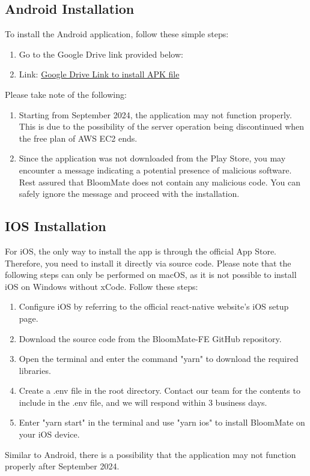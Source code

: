 \documentclass[conference, a4paper]{IEEEtran}
\begin{document}
\subsection{Android Installation}
To install the Android application, follow these simple steps:
\begin{enumerate}
    \item Go to the Google Drive link provided below:
    \item[]Link: \href{https://drive.google.com/drive/folders/1misbKdk9KiIgrsmARhBsaBBLhtyIzM-k?usp=drive_link}{Google Drive Link to install APK file}
\end{enumerate}
Please take note of the following:
\begin{enumerate}
    \item Starting from September 2024, the application may not function properly. This is due to the possibility of the server operation being discontinued when the free plan of AWS EC2 ends. \\
    \item Since the application was not downloaded from the Play Store, you may encounter a message indicating a potential presence of malicious software. Rest assured that BloomMate does not contain any malicious code. You can safely ignore the message and proceed with the installation.
\end{enumerate}

\subsection{IOS Installation}
For iOS, the only way to install the app is through the official App Store. Therefore, you need to install it directly via source code. Please note that the following steps can only be performed on macOS, as it is not possible to install iOS on Windows without xCode. 
\newline 
Follow these steps:
\begin{enumerate}
    \item Configure iOS by referring to the official react-native website's iOS setup page.
    \item Download the source code from the BloomMate-FE GitHub repository.
    \item Open the terminal and enter the command "yarn" to download the required libraries.
    \item Create a .env file in the root directory. Contact our team for the contents to include in the .env file, and we will respond within 3 business days.
    \item Enter "yarn start" in the terminal and use "yarn ios" to install BloomMate on your iOS device.
\end{enumerate}
Similar to Android, there is a possibility that the application may not function properly after September 2024. \\
\end{document}
